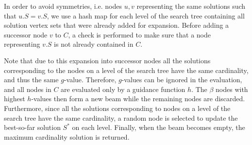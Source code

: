 \documentclass[draft,final]{vutinfth} %
\begin{document}
In order to avoid symmetries, i.e. nodes $u,v$ representing the same solutions such that $u.S = v.S$, we use a hash map for each level of the search tree containing all solution vertex sets that were already added for expansion. Before adding a successor node $v$ to $C$, a check is performed to make sure that a node representing $v.S$ is not already contained in $C$. 
 
Note that due to this expansion into successor nodes all the solutions corresponding to the nodes on a level of the search tree have the same cardinality, and thus the same $g$-value. 
Therefore, $g$-values can be ignored in the evaluation, and all nodes in $C$ are evaluated only by a guidance function $h$. The $\beta$ nodes with highest $h$-values then form a new beam while the remaining nodes are discarded. 
Furthermore, since all the solutions corresponding to nodes on a level of the search tree have the same cardinality, a random node is selected to update the best-so-far solution $S^*$ on each level.
Finally, when the beam becomes empty, the maximum cardinality solution is returned. 
\end{document}
